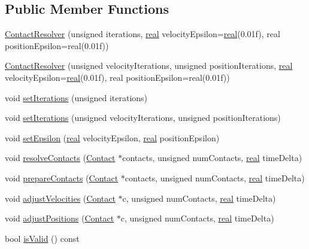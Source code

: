 \subsection*{Public Member Functions}
\begin{DoxyCompactItemize}
\item 
\mbox{\hyperlink{classrum_1_1_contact_resolver_adaf1fa2fd7b845fb3b0496505074bd01}{Contact\+Resolver}} (unsigned iterations, \mbox{\hyperlink{namespacerum_a7e8cca23573d5eaead0f138cbaa4862c}{real}} velocity\+Epsilon=\mbox{\hyperlink{namespacerum_a7e8cca23573d5eaead0f138cbaa4862c}{real}}(0.\+01f), real position\+Epsilon=real(0.\+01f))
\item 
\mbox{\hyperlink{classrum_1_1_contact_resolver_a0d517774fa736afb5eb9098a5051761a}{Contact\+Resolver}} (unsigned velocity\+Iterations, unsigned position\+Iterations, \mbox{\hyperlink{namespacerum_a7e8cca23573d5eaead0f138cbaa4862c}{real}} velocity\+Epsilon=\mbox{\hyperlink{namespacerum_a7e8cca23573d5eaead0f138cbaa4862c}{real}}(0.\+01f), real position\+Epsilon=real(0.\+01f))
\item 
void \mbox{\hyperlink{classrum_1_1_contact_resolver_a22500b8327332e7c95c100aa30160ff8}{set\+Iterations}} (unsigned iterations)
\item 
void \mbox{\hyperlink{classrum_1_1_contact_resolver_a2dd2bf231348dc011449f43e71087182}{set\+Iterations}} (unsigned velocity\+Iterations, unsigned position\+Iterations)
\item 
void \mbox{\hyperlink{classrum_1_1_contact_resolver_a6dd5b9d5e4057068fd96fff89a607bcc}{set\+Epsilon}} (\mbox{\hyperlink{namespacerum_a7e8cca23573d5eaead0f138cbaa4862c}{real}} velocity\+Epsilon, \mbox{\hyperlink{namespacerum_a7e8cca23573d5eaead0f138cbaa4862c}{real}} position\+Epsilon)
\item 
void \mbox{\hyperlink{classrum_1_1_contact_resolver_a5250cbfb65f911ea854ca05b39bbbca0}{resolve\+Contacts}} (\mbox{\hyperlink{classrum_1_1_contact}{Contact}} $\ast$contacts, unsigned num\+Contacts, \mbox{\hyperlink{namespacerum_a7e8cca23573d5eaead0f138cbaa4862c}{real}} time\+Delta)
\item 
void \mbox{\hyperlink{classrum_1_1_contact_resolver_a316867d8043a281a4d1d1d6e237ba7d4}{prepare\+Contacts}} (\mbox{\hyperlink{classrum_1_1_contact}{Contact}} $\ast$contacts, unsigned num\+Contacts, \mbox{\hyperlink{namespacerum_a7e8cca23573d5eaead0f138cbaa4862c}{real}} time\+Delta)
\item 
void \mbox{\hyperlink{classrum_1_1_contact_resolver_ae598b9b8332a1293ec59e4e20f6e3043}{adjust\+Velocities}} (\mbox{\hyperlink{classrum_1_1_contact}{Contact}} $\ast$c, unsigned num\+Contacts, \mbox{\hyperlink{namespacerum_a7e8cca23573d5eaead0f138cbaa4862c}{real}} time\+Delta)
\item 
void \mbox{\hyperlink{classrum_1_1_contact_resolver_aa926dab40e3e591854ef0cc707a7fd74}{adjust\+Positions}} (\mbox{\hyperlink{classrum_1_1_contact}{Contact}} $\ast$c, unsigned num\+Contacts, \mbox{\hyperlink{namespacerum_a7e8cca23573d5eaead0f138cbaa4862c}{real}} time\+Delta)
\item 
bool \mbox{\hyperlink{classrum_1_1_contact_resolver_aba2afe22f39a99cedf5cc3e6b22cabc4}{is\+Valid}} () const
\end{DoxyCompactItemize}
